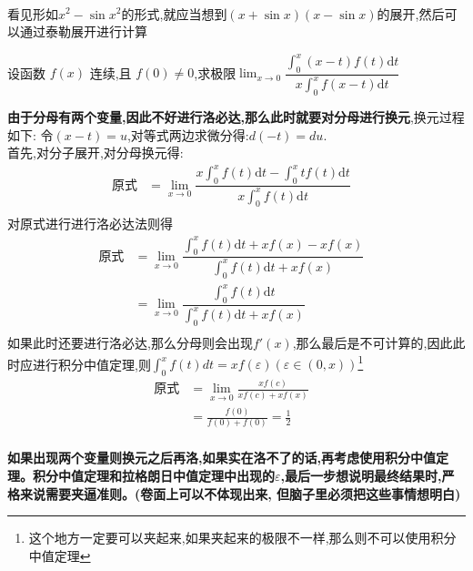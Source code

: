 \documentclass[8pt a4paper, oneside, UTF8]{ctexbook}
\begin{document}
\begin{sloppypar}
\begin{solution}
\begin{align*}
        \end{align*}
    \end{solution}
    \begin{note}
        看见形如$x^2-\sin x^2$的形式,就应当想到$(x+\sin x)(x-\sin x)$的展开,然后可以通过泰勒展开进行计算
    \end{note}
    \begin{problem}
        设函数 $f(x)$ 连续,且 $f(0)\neq0$,求极限$\operatorname*{lim}_{x\to0}{\dfrac{\int_{0}^{x}\left(x-t\right)f\left(t\right)\mathrm{d}t}{x\int_{0}^{x}f\left(x-t\right)\mathrm{d}t}}$
    \end{problem}
    \begin{solution}
        \textbf{由于分母有两个变量,因此不好进行洛必达,那么此时就要对分母进行换元},换元过程如下:
        令$(x-t)=u$,对等式两边求微分得:$d(-t)=du$.\\
        首先,对分子展开,对分母换元得:
        \begin{align*}
            \text{原式} & = \lim_{x\to0}\dfrac{x\int_{0}^{x}f(t)\mathrm{d}t-\int_{0}^{x}tf\left(t\right)\mathrm{d}t}{x\int_{0}^{x}f(t)\mathrm{d}t}  & \\ 
        \end{align*}
        对原式进行进行洛必达法则得
        \begin{align*}
            \text{原式} & = \lim_{x\to0}\dfrac{\int_0^xf(t)\mathrm{d}t+xf(x)-xf(x)}{\int_0^xf(t)\mathrm{d}t+xf(x)} & \\
            & =  \lim\limits_{x\to0}\dfrac{\int_0^xf(t)\mathrm{d}t}{\int_0^xf(t)\mathrm{d}t+xf(x)} & \\  
        \end{align*}
        如果此时还要进行洛必达,那么分母则会出现$f'(x)$,那么最后是不可计算的,因此此时应进行积分中值定理,则$\int _0 ^x f(t)dt=xf(\varepsilon) (\varepsilon \in (0,x))$\footnote{这个地方一定要可以夹起来,如果夹起来的极限不一样,那么则不可以使用积分中值定理}
        \begin{align*}
            \text{原式} & = \lim_{x\to0}\frac{xf\left(c\right)}{xf\left(c\right)+xf\left(x\right)} & \\
            & = \frac{f(0)}{f(0)+f(0)}=\frac12 &\\ 
        \end{align*}
    \end{solution}
    \begin{note}
        \textbf{如果出现两个变量则换元之后再洛,如果实在洛不了的话,再考虑使用积分中值定理。积分中值定理和拉格朗日中值定理中出现的$\varepsilon$,最后一步想说明最终结果时,严格来说需要夹逼准则。(卷面上可以不体现出来, 但脑子里必须把这些事情想明白)}\\

\end{note}
\end{sloppypar}
\end{document}
